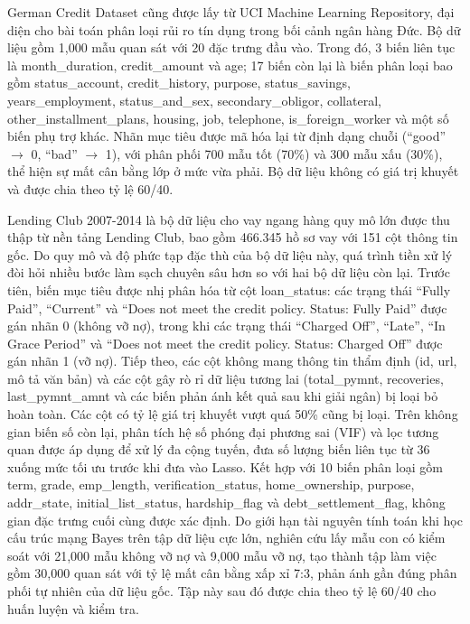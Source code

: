 German Credit Dataset cũng được lấy từ UCI Machine Learning Repository, đại diện cho bài toán phân loại rủi ro tín dụng trong bối cảnh ngân hàng Đức. Bộ dữ liệu gồm 1,000 mẫu quan sát với 20 đặc trưng đầu vào. Trong đó, 3 biến liên tục là month\_duration, credit\_amount và age; 17 biến còn lại là biến phân loại bao gồm status\_account, credit\_history, purpose, status\_savings, years\_employment, status\_and\_sex, secondary\_obligor, collateral, other\_installment\_plans, housing, job, telephone, is\_foreign\_worker và một số biến phụ trợ khác. Nhãn mục tiêu được mã hóa lại từ định dạng chuỗi (``good'' $\rightarrow$ 0, ``bad'' $\rightarrow$ 1), với phân phối 700 mẫu tốt (70\%) và 300 mẫu xấu (30\%), thể hiện sự mất cân bằng lớp ở mức vừa phải. Bộ dữ liệu không có giá trị khuyết và được chia theo tỷ lệ 60/40.

Lending Club 2007-2014 là bộ dữ liệu cho vay ngang hàng quy mô lớn được thu thập từ nền tảng Lending Club, bao gồm 466.345 hồ sơ vay với 151 cột thông tin gốc. Do quy mô và độ phức tạp đặc thù của bộ dữ liệu này, quá trình tiền xử lý đòi hỏi nhiều bước làm sạch chuyên sâu hơn so với hai bộ dữ liệu còn lại. Trước tiên, biến mục tiêu được nhị phân hóa từ cột loan\_status: các trạng thái ``Fully Paid'', ``Current'' và ``Does not meet the credit policy. Status: Fully Paid'' được gán nhãn 0 (không vỡ nợ), trong khi các trạng thái ``Charged Off'', ``Late'', ``In Grace Period'' và ``Does not meet the credit policy. Status: Charged Off'' được gán nhãn 1 (vỡ nợ). Tiếp theo, các cột không mang thông tin thẩm định (id, url, mô tả văn bản) và các cột gây rò rỉ dữ liệu tương lai (total\_pymnt, recoveries, last\_pymnt\_amnt và các biến phản ánh kết quả sau khi giải ngân) bị loại bỏ hoàn toàn. Các cột có tỷ lệ giá trị khuyết vượt quá 50\% cũng bị loại. Trên không gian biến số còn lại, phân tích hệ số phóng đại phương sai (VIF) và lọc tương quan được áp dụng để xử lý đa cộng tuyến, đưa số lượng biến liên tục từ 36 xuống mức tối ưu trước khi đưa vào Lasso. Kết hợp với 10 biến phân loại gồm term, grade, emp\_length, verification\_status, home\_ownership, purpose, addr\_state, initial\_list\_status, hardship\_flag và debt\_settlement\_flag, không gian đặc trưng cuối cùng được xác định. Do giới hạn tài nguyên tính toán khi học cấu trúc mạng Bayes trên tập dữ liệu cực lớn, nghiên cứu lấy mẫu con có kiểm soát với 21,000 mẫu không vỡ nợ và 9,000 mẫu vỡ nợ, tạo thành tập làm việc gồm 30,000 quan sát với tỷ lệ mất cân bằng xấp xỉ 7:3, phản ánh gần đúng phân phối tự nhiên của dữ liệu gốc. Tập này sau đó được chia theo tỷ lệ 60/40 cho huấn luyện và kiểm tra.


